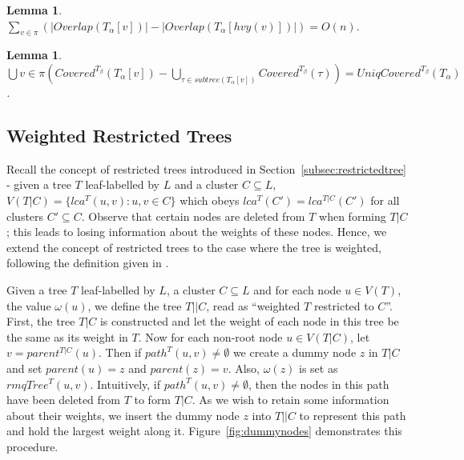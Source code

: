 \documentclass[final,1p,times]{elsarticle}
\newcommand{\weight}{\omega}
\newcommand{\TA}{T_\alpha}
\newcommand{\TB}{T_\beta}
\newtheorem{lemma}[theorem]{Lemma}
\begin{document}
    \begin{lemma}
	    $\sum_{v \in \pi} \left(|Overlap(T_{\alpha}[v])| - |Overlap(T_{\alpha}[hvy(v)])| \right) = O(n)$.
    \end{lemma}

    \begin{lemma}
	    $\bigcup{v \in \pi} \left( Covered^{\TB}(T_{\alpha}[v]) - \bigcup_{\tau \in subtree(T_{\alpha}[v])} Covered^{\TB}(\tau) \right) = UniqCovered^{\TB}(\TA)$.
    \end{lemma}

    \subsection{Weighted Restricted Trees}
    \label{subsec:restrictedweighted}

    Recall the concept of restricted trees introduced in Section~\ref{subsec:restrictedtree} - given a tree $T$ leaf-labelled by $L$ and a cluster $C \subseteq L$, $V(T|C) = \{lca^T(u, v) : u, v \in C\}$ which obeys $lca^T(C') = lca^{T|C}(C')$ for all clusters $C' \subseteq C$. Observe that certain nodes are deleted from $T$ when forming $T|C$; this leads to losing information about the weights of these nodes. Hence, we extend the concept of restricted trees to the case where the tree is weighted, following the definition given in \cite{jansson2018algorithms}.

    Given a tree $T$ leaf-labelled by $L$, a cluster $C \subseteq L$ and for each node $u \in V(T)$, the value $\weight(u)$, we define the tree $T||C$, read as ``weighted $T$ restricted to $C$''. First, the tree $T|C$ is constructed and let the weight of each node in this tree be the same as its weight in $T$. Now for each non-root node $u \in V(T|C)$, let $v = parent^{T|C}(u)$. Then if $path^{T}(u, v) \neq \emptyset$ we create a dummy node $z$ in $T|C$ and set $parent(u) = z$ and $parent(z) = v$. Also, $\weight(z)$ is set as $rmqTree^{T}(u, v)$. Intuitively, if $path^{T}(u, v) \neq \emptyset$, then the nodes in this path have been deleted from $T$ to form $T|C$. As we wish to retain some information about their weights, we insert the dummy node $z$ into $T||C$ to represent this path and hold the largest weight along it. Figure~\ref{fig:dummynodes} demonstrates this procedure.
\end{document}
